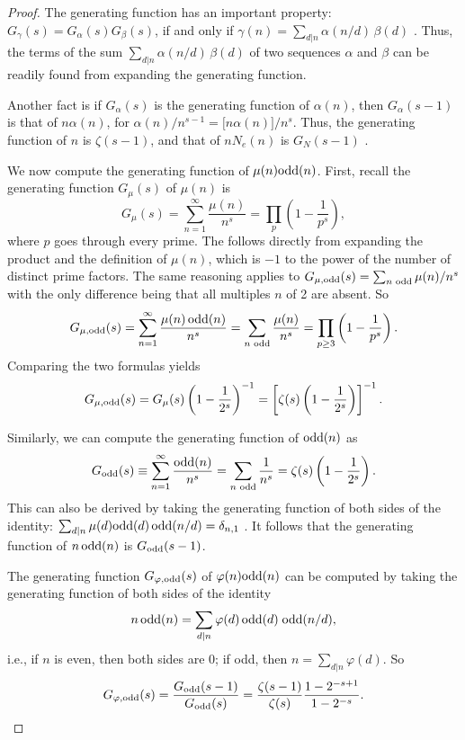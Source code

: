 \documentclass{ws-ijbc}
\begin{document}
\begin{proof}
The generating function has an important property:
$G_\gamma(s) = G_\alpha(s) G_\beta(s)$,
if and only if $\gamma(n) = \sum_{d|n} \alpha(n/d)\, \beta(d)$ \cite{hardy}.
Thus,
  the terms of the sum $\sum_{d|n} \alpha(n/d)\, \beta(d)$
  of two sequences $\alpha$ and $\beta$
  can be readily found from expanding the generating function.



Another fact is if $G_\alpha(s)$ is the generating function of $\alpha(n)$,
then $G_\alpha(s-1)$ is that of $n \alpha(n)$,
for $\alpha(n)/n^{s-1} = \big[ n \alpha(n) \big] / n^s$.
Thus, the generating function of $n$ is $\zeta(s-1)$,
and
that of $n N_e(n)$ is $G_N(s-1)$
.



We now compute the generating function of $\mu(n)\mathrm{odd}(n)$.
First, recall the generating function $G_\mu(s)$ of $\mu(n)$ is
\[
  G_\mu(s) = \sum_{n=1}^{\infty} \frac{\mu(n)}{n^s}
  = \prod_p \left( 1 - \frac{1}{p^s} \right),
\]
where $p$ goes through every prime.
%
The follows directly from expanding the product
  and the definition of $\mu(n)$,
which is $-1$ to the power of the number of distinct prime factors.
%
The same reasoning applies to
$G_{\mu, \mathrm{odd}}(s) = \sum_{n \text{ odd}} \mu(n)/n^s$
with the only difference being that all multiples $n$ of 2
are absent. So
%
\[
  G_{\mu, \mathrm{odd}}(s)
  = \sum_{n=1}^{\infty} \frac{\mu(n) \, \mathrm{odd}(n)}{n^s}
  = \sum_{n \text{ odd}} \frac{\mu(n)}{n^s}
  = \prod_{p \ge 3} \left( 1 - \frac{1}{p^s} \right).
\]
Comparing the two formulas yields
\[
  G_{\mu, \mathrm{odd}}(s)
  = G_{\mu}(s)
  \left(1- \frac{1}{2^s}\right)^{-1}
  =
   \left[ \zeta(s) \left(1- \frac{1}{2^s}\right) \right]^{-1}.
\]



Similarly,
we can compute the generating function of $\mathrm{odd}(n)$ as
\[
  G_{\mathrm{odd}}(s)
  \equiv \sum_{n=1}^{\infty} \frac{\mathrm{odd}(n)}{n^s}
  = \sum_{n \text{ odd}} \frac{1}{n^s}
  = \zeta(s) \left(1 - \frac{1}{2^s} \right).
\]
This can also be derived by taking the generating function of
both sides of the identity:
$\sum_{d|n} \mu(d) \mathrm{odd}(d) \, \mathrm{odd}(n/d) = \delta_{n, 1}$
\big[which is a modification of
$\sum_{d|n} \mu(d) = \delta_{n, 1}$\big].
%
It follows that the generating function of $n \, \mathrm{odd}(n)$ is $G_{\mathrm{odd}}(s-1)$.



The generating function $G_{\varphi,\mathrm{odd}}(s)$
of $\varphi(n) \mathrm{odd}(n)$ can be computed by taking the generating function
of both sides of the identity
\[
  n \, \mathrm{odd}(n)  = \sum_{d|n} \varphi(d) \, \mathrm{odd}(d) \; \mathrm{odd}(n/d),
\]
i.e., if $n$ is even, then both sides are 0;
if odd, then $n = \sum_{d|n} \varphi(d)$.
So
\[
  G_{\varphi,\mathrm{odd}}(s) = \frac{G_{\mathrm{odd}}(s-1)}{G_{\mathrm{odd}}(s)}
  = \frac{\zeta(s-1)}{\zeta(s)} \frac{1 - 2^{-s + 1}}{1 - 2^{-s}}.
\]



\end{proof}
\end{document}
